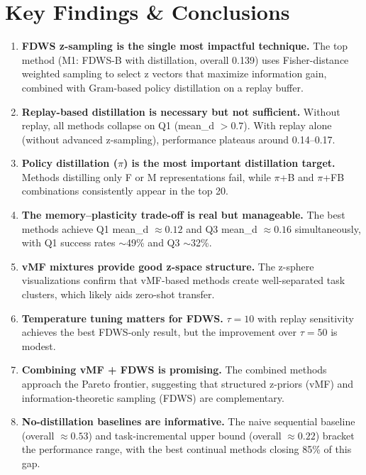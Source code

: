 \documentclass[11pt,a4paper]{article}
\begin{document}
\section{Key Findings \& Conclusions}

\begin{enumerate}
    \item \textbf{FDWS z-sampling is the single most impactful technique.}
    The top method (M1: FDWS-B with distillation, overall 0.139) uses Fisher-distance
    weighted sampling to select z vectors that maximize information gain, combined with
    Gram-based policy distillation on a replay buffer.

    \item \textbf{Replay-based distillation is necessary but not sufficient.}
    Without replay, all methods collapse on Q1 (mean\_d $> 0.7$).
    With replay alone (without advanced z-sampling), performance plateaus around 0.14--0.17.

    \item \textbf{Policy distillation ($\pi$) is the most important distillation target.}
    Methods distilling only F or M representations fail, while $\pi$+B and $\pi$+FB
    combinations consistently appear in the top 20.

    \item \textbf{The memory--plasticity trade-off is real but manageable.}
    The best methods achieve Q1 mean\_d $\approx 0.12$ and Q3 mean\_d $\approx 0.16$
    simultaneously, with Q1 success rates $\sim$49\% and Q3 $\sim$32\%.

    \item \textbf{vMF mixtures provide good z-space structure.}
    The z-sphere visualizations confirm that vMF-based methods create well-separated
    task clusters, which likely aids zero-shot transfer.

    \item \textbf{Temperature tuning matters for FDWS.}
    $\tau=10$ with replay sensitivity achieves the best FDWS-only result, but the
    improvement over $\tau=50$ is modest.

    \item \textbf{Combining vMF + FDWS is promising.}
    The combined methods approach the Pareto frontier, suggesting that structured
    z-priors (vMF) and information-theoretic sampling (FDWS) are complementary.

    \item \textbf{No-distillation baselines are informative.}
    The naive sequential baseline (overall $\approx 0.53$) and task-incremental
    upper bound (overall $\approx 0.22$) bracket the performance range, with the
    best continual methods closing 85\% of this gap.
\end{enumerate}
\end{document}

